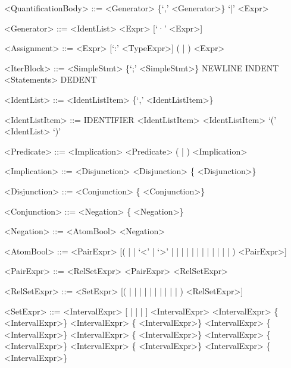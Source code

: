 \begin{grammar}
<QuantificationBody> ::= <Generator> \{`,' <Generator>\} `|' <Expr>

<Generator> ::= <IdentList> \lit{$\in$} <Expr> [`·' <Expr>]

<Assignment> ::= <Expr> [`:' <TypeExpr>] (\lit{$\coloneqq$} | \lit{$:\in$}) <Expr>

<IterBlock> ::= <SimpleStmt> \{`;' <SimpleStmt>\}
    \alt NEWLINE INDENT <Statements> DEDENT

<IdentList> ::= <IdentListItem> \{`,' <IdentListItem>\}

<IdentListItem> ::= IDENTIFIER
    \alt <IdentListItem> \lit{$\mapsto$} <IdentListItem>
    \alt `(' <IdentList> `)'

<Predicate> ::= <Implication>
    \alt <Predicate> (\lit{$\equiv$} | \lit{$\not\equiv$}) <Implication>

<Implication> ::= <Disjunction>
    \alt <Disjunction> \{\lit{$\Rightarrow$} <Disjunction>\}

<Disjunction> ::= <Conjunction> \{\lit{$\lor$} <Conjunction>\}

<Conjunction> ::= <Negation> \{\lit{$\land$} <Negation>\}

<Negation> ::= <AtomBool>
    \alt \lit{$\lnot$} <Negation>

<AtomBool> ::= <PairExpr> [(
        \lit{$=$}
      | \lit{$\neq$}
      | `<'
      | `>'
      | \lit{$\leq$}
      | \lit{$\geq$}
      | \lit{$\in$}
      | \lit{$\not\in$}
      | \lit{$\subset$}
      | \lit{$\subseteq$}
      | \lit{$\supset$}
      | \lit{$\supseteq$}
      | \lit{$\not\subset$}
      | \lit{$\not\subseteq$}
      | \lit{$\not\supset$}
      | \lit{$\not\supseteq$}
    ) <PairExpr>]

<PairExpr> ::= <RelSetExpr>
    \alt <PairExpr> \lit{$\mapsto$} <RelSetExpr>

<RelSetExpr> ::= <SetExpr> [(
      \lit{$\rel$}
    | \lit{$\trel$}
    | \lit{$\srel$}
    | \lit{$\strel$}
    | \lit{$\pfun$}
    | \lit{$\tfun$}
    | \lit{$\pinj$}
    | \lit{$\tinj$}
    | \lit{$\psur$}
    | \lit{$\tsur$}
    | \lit{$\tbij$}
) <RelSetExpr>]

<SetExpr> ::= <IntervalExpr> [\lit{$\domres$} | \lit{$\domsub$} | \lit{$\ranres$} | \lit{$\ransub$}] <IntervalExpr>
    \alt <IntervalExpr> \{\lit{$\cup$} <IntervalExpr>\}
    \alt <IntervalExpr> \{\lit{$\times$} <IntervalExpr>\}
    \alt <IntervalExpr> \{\lit{$\oplus$} <IntervalExpr>\}
    \alt <IntervalExpr> \{\lit{$\circ$} <IntervalExpr>\}
    \alt <IntervalExpr> \{\lit{$\cap$} <IntervalExpr>\}
    \alt <IntervalExpr> \{\lit{$\setminus$} <IntervalExpr>\}
    \alt <IntervalExpr> \{\lit{$\concat$} <IntervalExpr>\}


\end{grammar}
